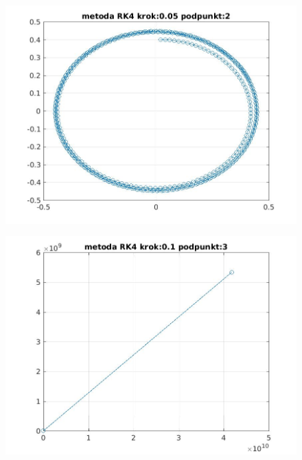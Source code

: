 \documentclass[a4paper, 11pt]{article}
\begin{document}
\begin{figure}[H]
\centering
\includegraphics[width = 15cm]{2d/metoda RK4 krok:0,05 podpunkt:2.jpg}
\end{figure}

\begin{figure}[H]
\centering
\includegraphics[width = 15cm]{2d/metoda RK4 krok:0,1 podpunkt:3.jpg}
\end{figure}
\end{document}
